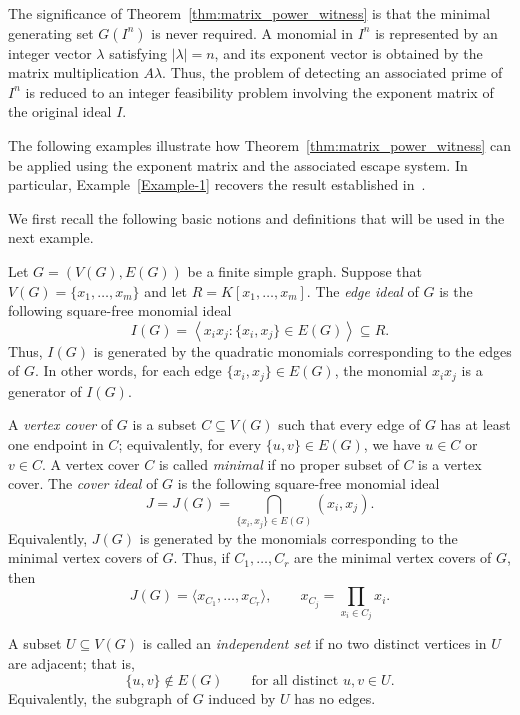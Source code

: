\documentclass[11pt]{amsart}   %
\begin{document}

The significance of Theorem~\ref{thm:matrix_power_witness} is that the
minimal generating set $G(I^n)$ is never required. A monomial in $I^n$
is represented by an integer vector $\lambda$ satisfying
$|\lambda|=n$, and its exponent vector is obtained by the matrix
multiplication $A\lambda.$ Thus, the problem of detecting an associated prime of $I^n$ is reduced
to an integer feasibility problem involving the exponent matrix of the
original ideal $I$.


The following examples illustrate how Theorem~\ref{thm:matrix_power_witness} can be applied using the exponent matrix and the associated
escape system. In particular, Example~\ref{Example-1} recovers the result established in~\cite[Proposition~3.6]{NKA}.




We first recall the following basic notions and definitions that will be
used in the next example.

Let $G=(V(G),E(G))$ be a finite simple graph. Suppose that $
V(G)=\{x_1,\ldots,x_m\}
$
and let $R=K[x_1,\ldots,x_m]$.
The \textit{edge ideal} of $G$ is the following square-free monomial ideal
\[
I(G)=\left\langle x_ix_j:\{x_i,x_j\}\in E(G)\right\rangle
\subseteq R.
\]
Thus, $I(G)$ is generated by the quadratic monomials corresponding to
the edges of $G$. In other words, for each edge
$\{x_i,x_j\}\in E(G)$, the monomial $x_ix_j$ is a generator of $I(G)$.

A \textit{vertex cover} of $G$ is a subset $C\subseteq V(G)$ such that
every edge of $G$ has at least one endpoint in $C$; equivalently, for
every $\{u,v\}\in E(G)$, we have $u\in C$ or $v\in C$. A vertex cover
$C$ is called \textit{minimal} if no proper subset of $C$ is a vertex
cover.
The \textit{cover ideal} of $G$ is the following square-free monomial ideal
\[
J=J(G)=\bigcap_{\{x_i,x_j\}\in E(G)}(x_i,x_j).
\]
Equivalently, $J(G)$ is generated by the monomials corresponding to the
minimal vertex covers of $G$. Thus, if
$C_1,\ldots,C_r$ are the minimal vertex covers of $G$, then
\[
J(G)=\langle x_{C_1},\ldots,x_{C_r}\rangle,
\qquad
x_{C_j}=\prod_{x_i\in C_j}x_i.
\]

A subset $U\subseteq V(G)$ is called an \textit{independent set} if no
two distinct vertices in $U$ are adjacent; that is,
\[
\{u,v\}\notin E(G)
\qquad\text{for all distinct }u,v\in U.
\]
Equivalently, the subgraph of $G$ induced by $U$ has no edges.
\end{document}
